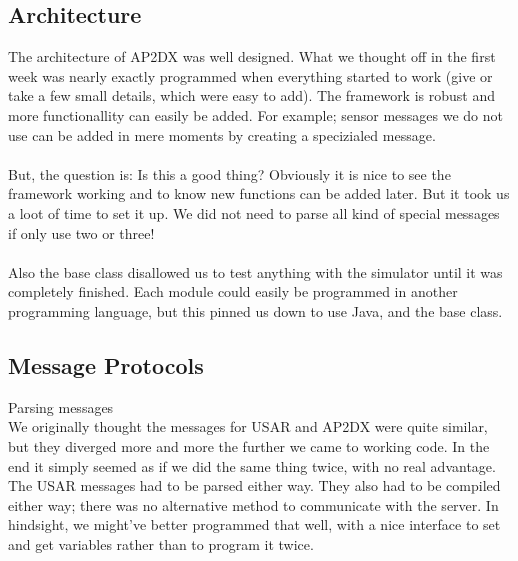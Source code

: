 \subsection{Architecture}
The architecture of AP2DX was well designed. What we thought off in the first week
was nearly exactly programmed when everything started to work (give or take a few
small details, which were easy to add). The framework is robust and more functionallity
can easily be added. For example; sensor messages we do not use can be added in mere moments 
by creating a specizialed message. 
\\\\
But, the question is: Is this a good thing? Obviously it is nice to see the framework working
and to know new functions can be added later. But it took us a loot of time to set it up. We 
did not need to parse all kind of special messages if only use two or three! 
\\\\
Also the base class disallowed us to test anything with the simulator until it was completely 
finished. Each module could easily be programmed in another programming language, but this
pinned us down to use Java, and the base class. 

\subsection{Message Protocols}
Parsing messages \\
We originally thought the messages for USAR and AP2DX were quite similar, but they diverged more
and more the further we came to working code. In the end it simply seemed as if we did the same
thing twice, with no real advantage. The USAR messages had to be parsed either way. They also
had to be compiled either way; there was no alternative method to communicate with the server. 
In hindsight, we might've better programmed that well, with a nice interface to set and get
variables rather than to program it twice. 
